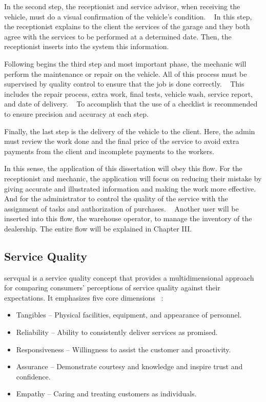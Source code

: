 In the second step, the receptionist and service advisor, when receiving the vehicle, must do a visual confirmation of the vehicle's condition. ~\cite{Setting_the_after_sale_process}
In this step, the receptionist explains to the client the services of the garage and they both agree with the services to be performed at a determined date. 
Then, the receptionist inserts into the system this information. ~\cite{Setting_the_after_sale_process}

Following begins the third step and most important phase, the mechanic will perform the maintenance or repair on the vehicle. 
All of this process must be supervised by quality control to ensure that the job is done correctly. ~\cite{Setting_the_after_sale_process}
This includes the repair process, extra work, final tests, vehicle wash, service report, and date of delivery. ~\cite{Setting_the_after_sale_process}
To accomplish that the use of a checklist is recommended to ensure precision and accuracy at each step. ~\cite{Setting_the_after_sale_process}

Finally, the last step is the delivery of the vehicle to the client. 
Here, the admin must review the work done and the final price of the service to avoid extra payments from the client and incomplete payments to the workers. ~\cite{Setting_the_after_sale_process}

In this sense, the application of this dissertation will obey this flow.
For the receptionist and mechanic, the application will focus on reducing their mistake by giving accurate and illustrated information and making the work more effective.
And for the administrator to control the quality of the service with the assignment of tasks and authorization of purchases.  
Another user will be inserted into this flow, the warehouse operator, to manage the inventory of the dealership. 
The entire flow will be explained in Chapter III. 

\subsection{Service Quality}
\ac{servqual} is a service quality concept that provides a multidimensional approach for comparing consumers' perceptions of service quality against their expectations. 
It emphasizes five core dimensions ~\cite{SERVQUAL_OLD}:


\begin{itemize}
   \item Tangibles – Physical facilities, equipment, and appearance of personnel.
   \item Reliability – Ability to consistently deliver services as promised.
   \item Responsiveness – Willingness to assist the customer and proactivity.
   \item Assurance – Demonstrate courtesy and knowledge and inspire trust and confidence.
   \item Empathy – Caring and treating customers as individuals.
  \end{itemize}

